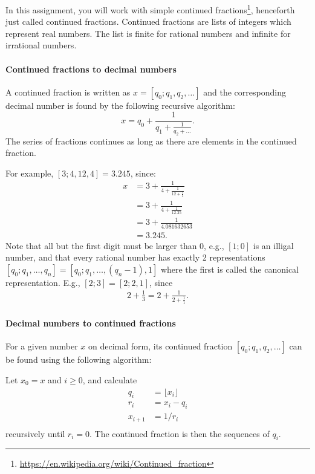In this assignment, you will work with simple continued fractions\footnote{\url{https://en.wikipedia.org/wiki/Continued_fraction}}, henceforth just called continued fractions. Continued fractions are lists of integers which represent real numbers. The list is finite for rational numbers and infinite for irrational numbers.

\paragraph{Continued fractions to decimal numbers}
A continued fraction is written as $x = [q_0; q_1, q_2, \ldots]$ and the corresponding decimal number is found by the following recursive algorithm:
\begin{equation}
  x = q_0 + \frac{1}{q_1 + \frac{1}{q_2 + \dots}}.
\end{equation}
The series of fractions continues as long as there are elements in the continued fraction.

For example, $[3;4, 12, 4] = 3.245$, since:
\begin{align}
  x &= 3 + \frac{1}{4 + \frac{1}{12 + \frac{1}{4}}}
  \\&= 3 + \frac{1}{4 + \frac{1}{12.25}}
  \\&= 3 + \frac{1}{4.081632653}
  \\&= 3.245.
\end{align}
Note that all but the first digit must be larger than 0, e.g., $[1;0]$ is an illigal number, and that every rational number has exactly 2 representations $[q_0; q_1,\ldots,q_n] = [q_0; q_1,\ldots,(q_n-1),1]$ where the first is called the canonical representation. E.g., $[2; 3] = [2; 2, 1]$, since
\begin{align}
  2 + \frac{1}{3} = 2 + \frac{1}{2 + \frac{1}{1}}.
\end{align}


\paragraph{Decimal numbers to continued fractions}
For a given number $x$ on decimal form, its continued fraction $[q_0; q_1, q_2, \ldots]$ can be found using the following algorithm:

Let $x_0 = x$ and $i \geq 0$, and calculate
\begin{align}
q_i &= \lfloor x_i \rfloor\\
r_i &= x_i - q_i\\
x_{i+1} &= 1/r_i\\
\end{align}
recursively until $r_i = 0$. The continued fraction is then the sequences of $q_i$.

